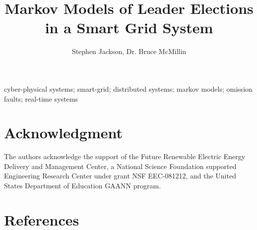 \documentclass[review]{elsarticle}
\begin{document}
\begin{frontmatter}

\title{Markov Models of Leader Elections in a Smart Grid System}

\author{Stephen Jackson, Dr. Bruce McMillin}
\address{\{scj7t4,ff\}@mst.edu
Missouri University of Science \& Technology
500 W. 15th St., Rolla, MO 65409}




\begin{abstract}

\end{abstract}

\begin{keyword}
cyber-physical systems; smart-grid; distributed systems; markov models; omission faults; real-time systems
\end{keyword}

\end{frontmatter}

\linenumbers









\section*{Acknowledgment}

The authors acknowledge the support of the Future Renewable
Electric Energy Delivery and Management Center,
a National Science Foundation supported Engineering Research
Center under grant NSF EEC-081212, and the United States Department of Education GAANN program.

\section*{References}



\appendix

\end{document}
